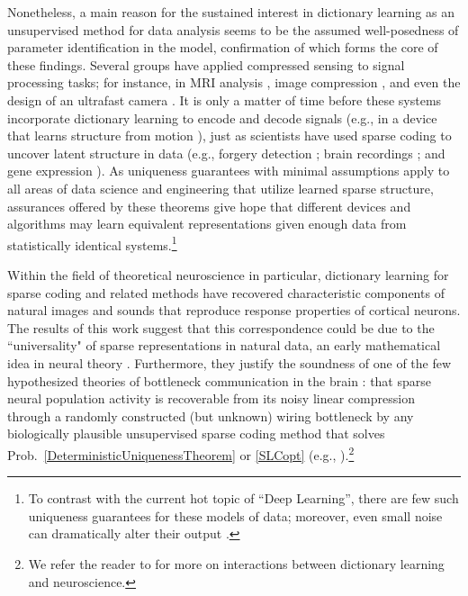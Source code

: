 Nonetheless, a main reason for the sustained interest in dictionary learning as an unsupervised method for data analysis seems to be the assumed well-posedness of parameter identification in the model, confirmation of which forms the core of these findings. Several groups have applied compressed sensing to signal processing tasks; for instance, in MRI analysis \cite{lustig2008compressed}, image compression \cite{Duarte08}, and even the design of an ultrafast camera \cite{Gao14}. It is only a matter of time before these systems incorporate dictionary learning to encode and decode signals (e.g., in a device that learns structure from motion \cite{kong2016prior}), just as scientists have used sparse coding to %
uncover latent structure in data (e.g., forgery detection \cite{hughes2010, olshausen2010applied}; brain recordings \cite{jung2001imaging, agarwal2014spatially, lee2016sparse}; and gene expression \cite{wu2016stability}). As uniqueness guarantees with minimal assumptions apply to all areas of data science and engineering that utilize learned sparse structure, assurances offered by these theorems give hope that different devices and algorithms may learn equivalent representations given enough data from statistically identical systems.\footnote{To contrast with the current hot topic of ``Deep Learning'', there are few such uniqueness guarantees for these models of data; moreover, even small noise can dramatically alter their output \cite{goodfellow2014explaining}.} 


Within the field of theoretical neuroscience in particular, dictionary learning for sparse coding and related methods have recovered characteristic components of natural images \cite{Olshausen96, hyvarinen1999fast, bell1997independent, van1998independent} and sounds \cite{bellsejnowski1996, smithlewicki2006, Carlson12} that reproduce response properties of cortical neurons. The results of this work suggest that this correspondence could be due to the ``universality" of sparse representations in natural data, an early mathematical idea in neural theory \cite{pitts1947}. Furthermore, they justify the soundness of one of the few hypothesized theories of bottleneck communication in the brain \cite{Isely10}: that sparse neural population activity is recoverable from its noisy linear compression through a randomly constructed (but unknown) wiring bottleneck by any biologically plausible unsupervised sparse coding method that solves Prob.~\ref{DeterministicUniquenessTheorem} or \ref{SLCopt} (e.g., \cite{rehnsommer2007, rozell2007neurally, pehlevan2015normative}).\footnote{We refer the reader to \cite{ganguli2012compressed} for more on interactions between dictionary learning and neuroscience.}

